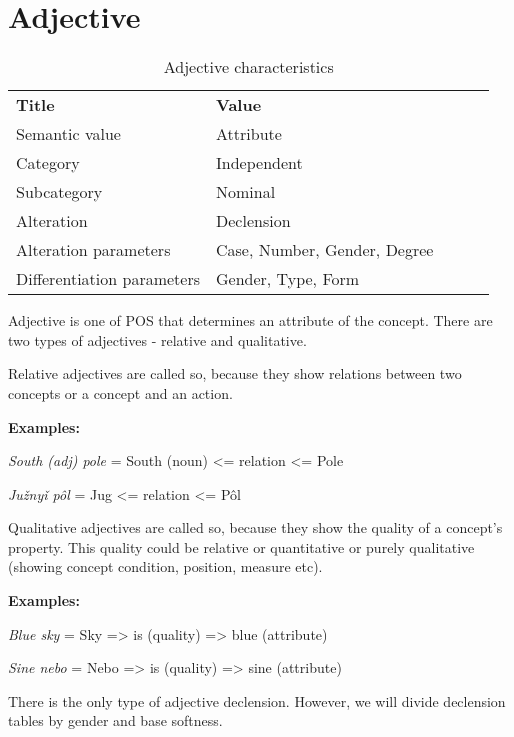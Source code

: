 \section{Adjective}

\begin{table}[h]
	\caption{Adjective characteristics}
	\begin{tabular}{lllll}
		\textbf{Title}              & \textbf{Value}               \\
		Semantic value              & Attribute                    \\
		Category                    & Independent                  \\
		Subcategory                 & Nominal                      \\
		Alteration                  & Declension                   \\
		Alteration parameters       & Case, Number, Gender, Degree \\
		Differentiation parameters  & Gender, Type, Form
	\end{tabular}
\end{table}

Adjective is one of POS that determines an attribute of the concept. There are two types of adjectives - relative and qualitative. 

Relative adjectives are called so, because they show relations between two concepts or a concept and an action.

\textbf{Examples:}

\textit{South (adj) pole} = South (noun) <= relation <= Pole

\textit{Južnyǐ pôl} = Jug <= relation <= Pôl

Qualitative adjectives are called so, because they show the quality of a concept’s property. This quality could be relative or quantitative or purely qualitative (showing concept condition, position, measure etc).

\textbf{Examples:}

\textit{Blue sky} = Sky => is (quality) => blue (attribute)

\textit{Sine nebo} = Nebo => is (quality) => sine (attribute) 

There is the only type of adjective declension. However, we will divide declension tables by gender and base softness.

